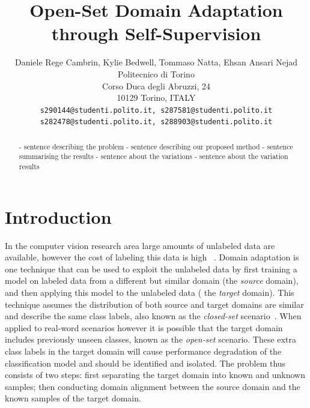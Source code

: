\documentclass[10pt,twocolumn,letterpaper]{article}
\begin{document}
\title{Open-Set Domain Adaptation through Self-Supervision}

\author{Daniele Rege Cambrin, Kylie Bedwell, Tommaso Natta, Ehsan Ansari Nejad\\
Politecnico di Torino\\
Corso Duca degli Abruzzi, 24\\
10129 Torino, ITALY\\
{\tt\small s290144@studenti.polito.it, s287581@studenti.polito.it} \\
{\tt\small s282478@studenti.polito.it, s288903@studenti.polito.it}
}
\maketitle

\begin{abstract}
   - sentence describing the problem
 - sentence describing our proposed method
 - sentence summarising the results
 - sentence about the variations
 - sentence about the variation results
\end{abstract}

\section{Introduction}
\label{sec:intro}

In the computer vision research area large amounts of unlabeled data are available, however the cost of labeling this data is high ~\cite{Csurka2017, Zhang2016}. Domain adaptation is one technique that can be used to exploit the unlabeled data by first training a model on labeled data from a different but similar domain (the \textit{source} domain), and then applying this model to the unlabeled data ( the \textit{target} domain). This technique assumes the distribution of both source and target domains are similar and describe the same class labels, also known as the \textit{closed-set} scenario~\cite{Bucci2020}. When applied to real-word scenarios however it is possible that the target domain includes previously unseen classes, known as the \textit{open-set} scenario. These extra class labels in the target domain will cause performance degradation of the classification model and should be identified and isolated. The problem thus consists of two steps: first separating the target domain into known and unknown samples; then conducting domain alignment between the source domain and the known samples of the target domain. 
\end{document}
